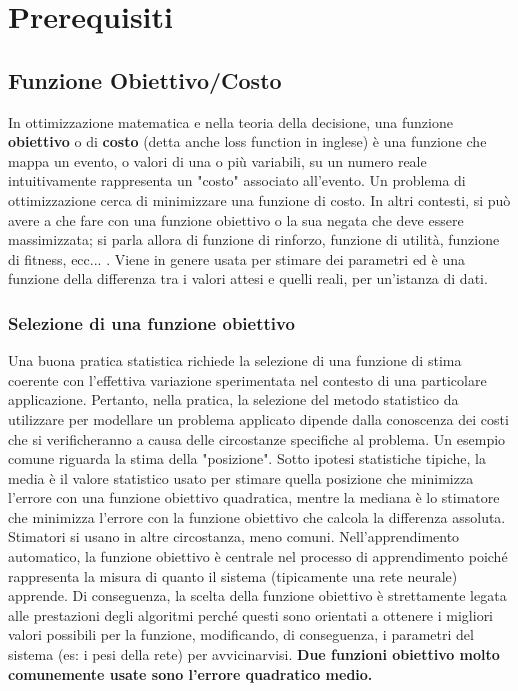 \chapter{Prerequisiti}
\section{Funzione Obiettivo/Costo}
   In ottimizzazione matematica e nella teoria della decisione, una funzione \textbf{obiettivo} \cite{funzioneObiettivo} o di \textbf{costo} (detta anche loss function in inglese) è una funzione che mappa un evento, o valori di una o più variabili, su un numero reale intuitivamente rappresenta un "costo" associato all'evento. Un problema di ottimizzazione cerca di minimizzare una funzione di costo. In altri contesti, si può avere a che fare con una funzione obiettivo o la sua negata che deve essere massimizzata; si parla allora di funzione di rinforzo, funzione di utilità, funzione di fitness, ecc... . Viene in genere usata per stimare dei parametri ed è una funzione della differenza tra i valori attesi e quelli reali, per un'istanza di dati.
   \subsection{Selezione di una funzione obiettivo}
   Una buona pratica statistica richiede la selezione di una funzione di stima coerente con l'effettiva variazione sperimentata nel contesto di una particolare applicazione. Pertanto, nella pratica, la selezione del metodo statistico da utilizzare per modellare un problema applicato dipende dalla conoscenza dei costi che si verificheranno a causa delle circostanze specifiche al problema.
Un esempio comune riguarda la stima della "posizione". Sotto ipotesi statistiche tipiche, la media è il valore statistico usato per stimare quella posizione che minimizza l'errore con una funzione obiettivo quadratica, mentre la mediana è lo stimatore che minimizza l'errore con la funzione obiettivo che calcola la differenza assoluta. Stimatori si usano in altre circostanza, meno comuni. 
   Nell'apprendimento automatico, la funzione obiettivo è centrale nel processo di apprendimento poiché rappresenta la misura di quanto il sistema (tipicamente una rete neurale) apprende. Di conseguenza, la scelta della funzione obiettivo è strettamente legata alle prestazioni degli algoritmi perché questi sono orientati a ottenere i migliori valori possibili per la funzione, modificando, di conseguenza, i parametri del sistema (es: i pesi della rete) per avvicinarvisi. 
   \textbf{Due funzioni obiettivo molto comunemente usate sono l'errore quadratico medio.}
